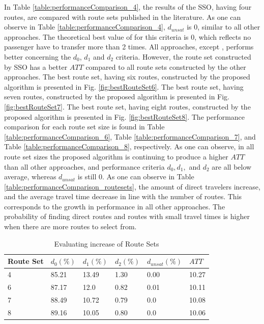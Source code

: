 In Table \vref{table:performanceComparison_4}, the results of the SSO, having four routes, are compared with route sets published in the literature. As one can observe in Table \vref{table:performanceComparison_4},  $d_{unsat}$ is 0, similar to all other approaches. The theoretical best value of for this criteria is 0, which reflects no passenger have to transfer more than 2 times. All approaches, except \citep{mandl79, kidwai98, chakroborty02}, performs better concerning the $d_0$, $d_1$ and $d_2$ criteria. However, the route set constructed by SSO has a better $ATT$ compared to all route sets constructed by the other approaches. The best route set, having six routes, constructed by the proposed algorithm is presented in Fig. \vref{fig:bestRouteSet6}. The best route set, having seven routes, constructed by the proposed algorithm is presented in Fig. \vref{fig:bestRouteSet7}. The best route set, having eight routes, constructed by the proposed algorithm is presented in Fig. \vref{fig:bestRouteSet8}. The performance comparison for each route set size is found in Table \vref{table:performanceComparison_6}, Table \vref{table:performanceComparison_7}, and Table \vref{table:performanceComparison_8}, respectively. As one can observe, in all route set sizes the proposed algorithm is continuing to produce a higher $ATT$ than all other approaches, and performance criteria $d_0, d_1,$ and $d_{2}$ are all below average, whereas $d_{unsat}$ is still 0. As one can observe in Table \vref{table:performanceComparison_routesets}, the amount of direct travelers increase, and the average travel time decrease in line with the number of routes. This corresponds to the growth in performance in all other approaches. The probability of finding direct routes and routes with small travel times is higher when there are more routes to select from. 

 \begin{table}[H]
    \centering
    \begin{tabular}{|l||l|l|l|l|l|}
    \hline
    Route Set & $d_0(\%)$ & $d_1(\%)$ & $d_2(\%)$ & $d_{unsat}(\%)$ & $ATT$ \\
    \hline
    4 & 85.21 & 13.49 & 1.30 & 0.00 & 10.27\\
    6 & 87.17 & 12.0 & 0.82 & 0.01 & 10.11\\
    7 & 88.49 & 10.72 & 0.79 & 0.0 & 10.08\\
    8 & 89.16 & 10.05 & 0.80 & 0.0 & 10.06\\
    \hline
    \end{tabular}
    \caption {Evaluating increase of Route Sets}
    \label{table:performanceComparison_routesets}
\end{table}

